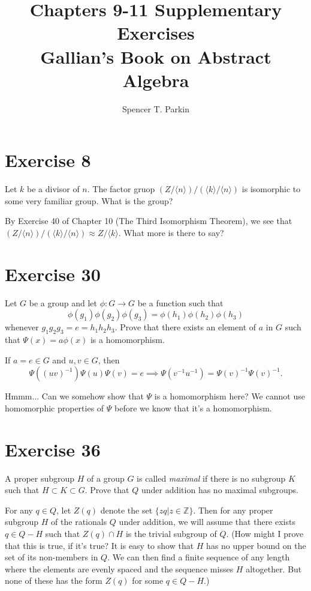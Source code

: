 \documentclass[12pt]{article}
\title{Chapters 9-11 Supplementary Exercises\\Gallian's Book on Abstract Algebra}
\author{Spencer T. Parkin}
\newcommand{\Z}{\mathbb{Z}}
\begin{document}
\maketitle

\section*{Exercise 8}

Let $k$ be a divisor of $n$.  The factor gruop $(Z/\langle n\rangle)/(\langle k\rangle/\langle n\rangle)$
is isomorphic to some very familiar group.  What is the group?

By Exercise 40 of Chapter 10 (The Third Isomorphism Theorem), we
see that $(Z/\langle n\rangle)/(\langle k\rangle/\langle n\rangle)\approx Z/\langle k\rangle$.
What more is there to say?

\section*{Exercise 30}

Let $G$ be a group and let $\phi:G\to G$ be a function such that
\begin{equation*}
\phi(g_1)\phi(g_2)\phi(g_3) = \phi(h_1)\phi(h_2)\phi(h_3)
\end{equation*}
whenever $g_1g_2g_3=e=h_1h_2h_3$.  Prove that there exists an element of $a$
in $G$ such that $\Psi(x)=a\phi(x)$ is a homomorphism.

If $a=e\in G$ and $u,v\in G$, then
\begin{equation*}
\Psi((uv)^{-1})\Psi(u)\Psi(v) = e\implies \Psi(v^{-1}u^{-1})=\Psi(v)^{-1}\Psi(v)^{-1}.
\end{equation*}

Hmmm...  Can we somehow show that $\Psi$ is a homomorphism here?
We cannot use homomorphic properties of $\Psi$ before we know that it's
a homomorphism.

\section*{Exercise 36}

A proper subgroup $H$ of a group $G$ is called {\it maximal} if there is no
subgroup $K$ such that $H\subset K\subset G$.  Prove that $Q$ under
addition has no maximal subgroups.

For any $q\in Q$, let $Z(q)$ denote the set $\{zq|z\in\Z\}$.
Then for any proper subgroup $H$ of the rationals $Q$ under addition,
we will assume that there exists $q\in Q-H$ such that $Z(q)\cap H$ is the trivial
subgroup of $Q$.  (How might I prove that this is true, if it's true?  It is
easy to show that $H$ has no upper bound on the set of its non-members in $Q$.
We can then find a finite sequence of any length where the elements are evenly spaced
and the sequence misses $H$ altogether.  But none of these has the form $Z(q)$ for some $q\in Q-H$.)
\end{document}
